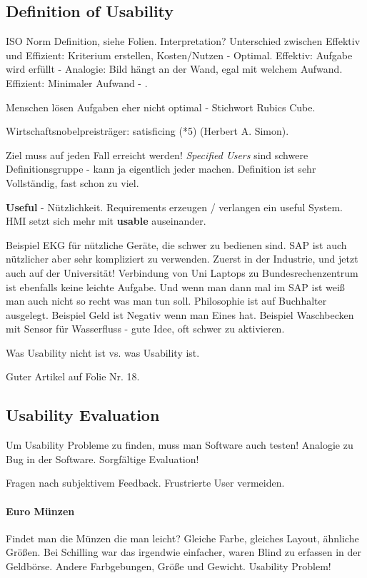 \subsection{Definition of Usability}
ISO Norm Definition, siehe Folien. Interpretation? Unterschied zwischen Effektiv
und Effizient: Kriterium erstellen, Kosten/Nutzen - Optimal.
Effektiv: Aufgabe wird erfüllt - Analogie: Bild hängt an der Wand, egal mit welchem Aufwand.
Effizient: Minimaler Aufwand - .

Menschen lösen Aufgaben eher nicht optimal - Stichwort Rubics Cube.

Wirtschaftsnobelpreisträger: satisficing (*5) (Herbert A. Simon).

Ziel muss auf jeden Fall erreicht werden! \textit{Specified Users} sind schwere
Definitionsgruppe - kann ja eigentlich jeder machen.
Definition ist sehr Vollständig, fast schon zu viel.

\textbf{Useful} - Nützlichkeit. Requirements erzeugen / verlangen ein useful System.
HMI setzt sich mehr mit \textbf{usable} auseinander.

Beispiel EKG für nützliche Geräte, die schwer zu bedienen sind. 
SAP ist auch nützlicher aber sehr kompliziert zu verwenden. 
Zuerst in der Industrie, und jetzt auch auf der Universität! 
Verbindung von Uni Laptops zu Bundesrechenzentrum ist ebenfalls keine leichte Aufgabe. 
Und wenn man dann mal im SAP ist weiß man auch nicht so recht was man tun soll. 
Philosophie ist auf Buchhalter ausgelegt. 
Beispiel Geld ist Negativ wenn man Eines hat.
Beispiel Waschbecken mit Sensor für Wasserfluss - gute Idee, oft schwer zu aktivieren.

Was Usability nicht ist vs. was Usability ist.

Guter Artikel auf Folie Nr. 18.

\subsection{Usability Evaluation}
Um Usability Probleme zu finden, muss man Software auch testen! Analogie zu Bug in 
der Software. Sorgfältige Evaluation!

Fragen nach subjektivem Feedback. Frustrierte User vermeiden.

\paragraph{Euro Münzen}
Findet man die Münzen die man leicht? Gleiche Farbe, gleiches Layout, ähnliche
Größen. Bei Schilling war das irgendwie einfacher, waren Blind zu erfassen in der 
Geldbörse. Andere Farbgebungen, Größe und Gewicht. Usability Problem!


